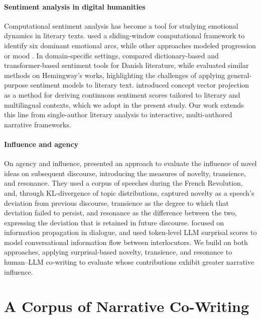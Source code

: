 \documentclass[11pt]{article}
\begin{document}
\paragraph{Sentiment analysis in digital humanities}
Computational sentiment analysis has become a tool for studying emotional dynamics in literary texts. \citet{reagan2016emotional} used a sliding-window computational framework to identify six dominant emotional arcs, while other approaches modeled progression \cite{hu2021dynamic} or mood \cite{ohman2022computational}. In domain-specific settings, \citet{feldkamp2024comparing} compared dictionary-based and transformer-based sentiment tools for Danish literature, while \citet{Bizzoni2023ComparingTA} evaluated similar methods on Hemingway's works, highlighting the challenges of applying general-purpose sentiment models to literary text. \citet{lyngbaek2025continuous} introduced concept vector projection as a method for deriving continuous sentiment scores tailored to literary and multilingual contexts, which we adopt in the present study. Our work extends this line from single-author literary analysis to interactive, multi-authored narrative frameworks.

\paragraph{Influence and agency}
On agency and influence, \citet{barron2018individuals} presented an approach to evaluate the influence of novel ideas on subsequent discourse, introducing the measures of novelty, transience, and resonance. They used a corpus of speeches during the French Revolution, and, through KL-divergence of topic distributions, captured novelty as a speech's deviation from previous discourse, transience as the degree to which that deviation failed to persist, and resonance as the difference between the two, expressing the deviation that is retained in future discourse. \citet{bergey2024yeah} focused on information propagation in dialogue, and used token-level LLM surprisal scores to model conversational information flow between interlocutors. We build on both approaches, applying surprisal-based novelty, transience, and resonance to human--LLM co-writing to evaluate whose contributions exhibit greater narrative influence.



\section{A Corpus of Narrative Co-Writing}
\end{document}
